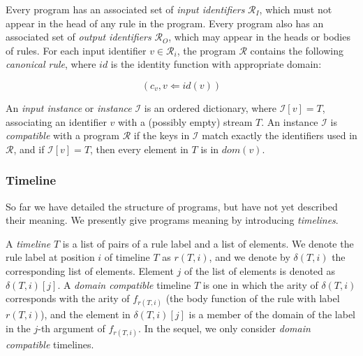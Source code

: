 Every program has an associated set of {\em input identifiers} $\mathcal{R}_I$, which must not appear in the head of any rule in the program.  Every program also has an associated set of {\em output identifiers} $\mathcal{R}_O$, which may appear in the heads or bodies of rules.  For each input identifier $v \in \mathcal{R}_i$, the program $\mathcal{R}$ contains the following {\em canonical rule}, where $id$ is the identity function with appropriate domain:

$$(c_v, v \Leftarrow id(v)) $$

An {\em input instance} or {\em instance} $\mathcal{I}$ is an ordered dictionary, where $\mathcal{I}[v] = T$, associating an identifier $v$ with a (possibly empty) stream $T$.  An instance $\mathcal{I}$ is {\em compatible} with a program $\mathcal{R}$ if the keys in $\mathcal{I}$ match exactly the identifiers used in $\mathcal{R}$, and if $\mathcal{I}[v] = T$, then every element in $T$ is in $dom(v)$.

\subsubsection{Timeline}

So far we have detailed the structure of programs, but have not yet described their meaning.  We presently give programs meaning by introducing {\em timelines}.

A {\em timeline} $T$ is a list of pairs of a rule label and a list of elements.  We denote the rule label at position $i$ of timeline $T$ as $r(T, i)$, and we denote by $\delta(T, i)$ the corresponding list of elements.  Element $j$ of the list of elements is denoted as $\delta(T,i)[j]$.  A {\em domain compatible} timeline $T$ is one in which the arity of $\delta(T, i)$ corresponds with the arity of $f_{r(T,i)}$ (the body function of the rule with label $r(T,i)$), and the element in $\delta(T,i)[j]$ is a member of the domain of the label in the $j$-th argument of $f_{r(T,i)}$.  In the sequel, we only consider {\em domain compatible} timelines.

